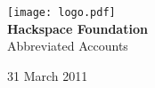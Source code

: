 


\begin{titlepage}
\begin{center}
\texttt{[image: logo.pdf]}\\[48pt]
{\bf \LARGE Hackspace Foundation}\\[36pt]
{\Large Abbreviated Accounts}

\vfill
31 March 2011

\end{center}
\end{titlepage}





